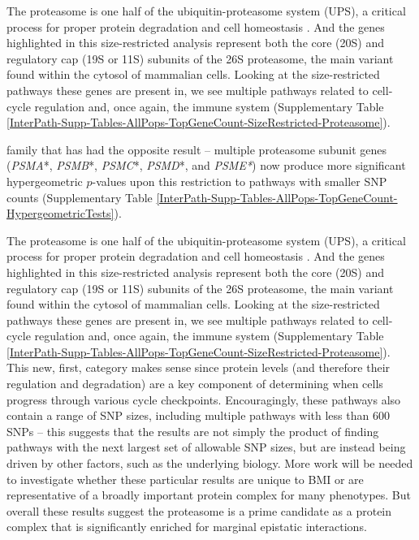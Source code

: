 \documentclass[12pt,a4paper]{article}
\begin{document}




The proteasome is one half of the ubiquitin-proteasome system (UPS), a critical process for proper protein degradation and cell homeostasis \citep{Voges1999,Livneh2016,Collins2017}. And the genes highlighted in this size-restricted analysis represent both the core (20S) and regulatory cap (19S or 11S) subunits of the 26S proteasome, the main variant found within the cytosol of mammalian cells. Looking at the size-restricted pathways these genes are present in, we see multiple pathways related to cell-cycle regulation and, once again, the immune system (Supplementary Table \ref{InterPath-Supp-Tables-AllPops-TopGeneCount-SizeRestricted-Proteasome}).


family that has had the opposite result -- multiple proteasome subunit genes (\textit{PSMA}*, \textit{PSMB}*, \textit{PSMC}*, \textit{PSMD}*, and \textit{PSME*}) now produce more significant hypergeometric $p$-values upon this restriction to pathways with smaller SNP counts (Supplementary Table \ref{InterPath-Supp-Tables-AllPops-TopGeneCount-HypergeometricTests}). 

The proteasome is one half of the ubiquitin-proteasome system (UPS), a critical process for proper protein degradation and cell homeostasis \citep{Voges1999,Livneh2016,Collins2017}. And the genes highlighted in this size-restricted analysis represent both the core (20S) and regulatory cap (19S or 11S) subunits of the 26S proteasome, the main variant found within the cytosol of mammalian cells. Looking at the size-restricted pathways these genes are present in, we see multiple pathways related to cell-cycle regulation and, once again, the immune system (Supplementary Table \ref{InterPath-Supp-Tables-AllPops-TopGeneCount-SizeRestricted-Proteasome}). This new, first, category makes sense since protein levels (and therefore their regulation and degradation) are a key component of determining when cells progress through various cycle checkpoints. Encouragingly, these pathways also contain a range of SNP sizes, including multiple pathways with less than 600 SNPs -- this suggests that the results are not simply the product of finding pathways with the next largest set of allowable SNP sizes, but are instead being driven by other factors, such as the underlying biology. More work will be needed to investigate whether these particular results are unique to BMI or are representative of a broadly important protein complex for many phenotypes. But overall these results suggest the proteasome is a prime candidate as a protein complex that is significantly enriched for marginal epistatic interactions.  





\fi
\end{document}
